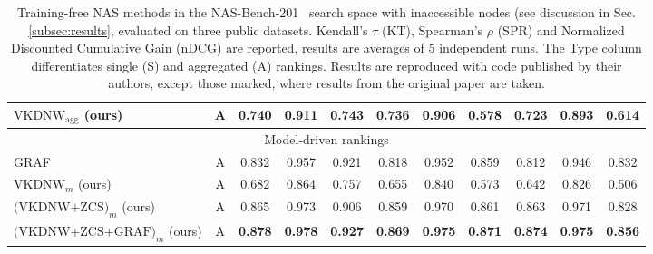 \begin{table*}[t]
\begin{tabular}{lc|ccc|ccc|ccc}
$\text{VKDNW}_{\text{agg}}$ (ours)& A & \textbf{0.740} & 0.911 & \textbf{0.743} & \textbf{0.736} & \textbf{0.906} & \textbf{0.578} & \textbf{0.723} & \textbf{0.893} & \textbf{0.614} \\
 \hline
 \multicolumn{11}{c}{Model-driven rankings}\\
 \hline
GRAF \cite{kadlecova2024surprisingly} & A & 0.832 & 0.957 & 0.921 & 0.818 & 0.952 & 0.859 & 0.812 & 0.946 & 0.832 \\
$\text{VKDNW}_{m}$ (ours) & A & 0.682 & 0.864 & 0.757 & 0.655 & 0.840 & 0.573 & 0.642 & 0.826 & 0.506 \\
$\text{(VKDNW+ZCS)}_{m}$ (ours) & A & 0.865 & 0.973 & 0.906 & 0.859 & 0.970 & 0.861 & 0.863 & 0.971 & 0.828 \\
$\text{(VKDNW+ZCS+GRAF)}_{m}$ (ours) & A & \textbf{0.878} & \textbf{0.978} & \textbf{0.927} & \textbf{0.869} & \textbf{0.975} & \textbf{0.871} & \textbf{0.874} & \textbf{0.975} & \textbf{0.856} \\
\end{tabular}
\caption{Training-free NAS methods in the NAS-Bench-201~\cite{dong2020bench} search space with inaccessible nodes (see discussion in Sec. \ref{subsec:results}, evaluated on three public datasets. Kendall's $\tau$ (KT), Spearman's $\rho$ (SPR) and Normalized Discounted Cumulative Gain ($\text{nDCG}$) are reported, results are averages of 5 independent runs. The Type column differentiates single (S) and aggregated (A) rankings. Results are reproduced with code published by their authors, except those marked\dag, where results from the original paper are taken. 
}
\label{tab:table1_unfiltered}
\end{table*}